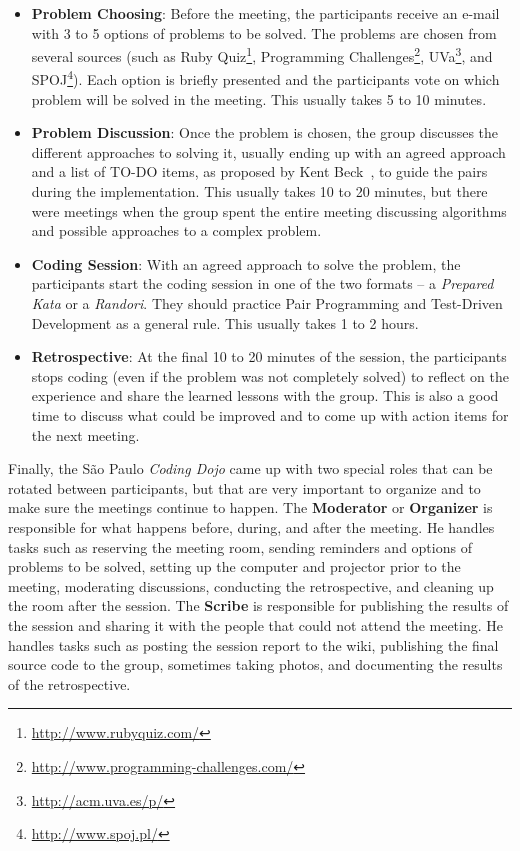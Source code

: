 \begin{itemize}
\item \textbf{Problem Choosing}: Before the meeting, the participants
  receive an e-mail with 3 to 5 options of problems to be solved. The
  problems are chosen from several sources (such as Ruby
  Quiz\footnote{\url{http://www.rubyquiz.com/}}, Programming
  Challenges\footnote{\url{http://www.programming-challenges.com/}},
  UVa\footnote{\url{http://acm.uva.es/p/}}, and
  SPOJ\footnote{\url{http://www.spoj.pl/}}). Each option is briefly
  presented and the participants vote on which problem will be solved
  in the meeting. This usually takes 5 to 10 minutes.
	
\item \textbf{Problem Discussion}: Once the problem is chosen, the
  group discusses the different approaches to solving it, usually
  ending up with an agreed approach and a list of TO-DO items, as
  proposed by Kent Beck~\cite{TDD}, to guide the pairs during the
  implementation. This usually takes 10 to 20 minutes, but there were
  meetings when the group spent the entire meeting discussing
  algorithms and possible approaches to a complex problem.
	
\item \textbf{Coding Session}: With an agreed approach to solve the
  problem, the participants start the coding session in one of the two
  formats -- a \emph{Prepared Kata} or a \emph{Randori}. They should
  practice Pair Programming and Test-Driven Development as a general
  rule. This usually takes 1 to 2 hours.

\item \textbf{Retrospective}: At the final 10 to 20 minutes of the
  session, the participants stops coding (even if the problem was not
  completely solved) to reflect on the experience and share the
  learned lessons with the group. This is also a good time to discuss
  what could be improved and to come up with action items for the next
  meeting.
\end{itemize}

Finally, the São Paulo \emph{Coding Dojo} came up with two special
roles that can be rotated between participants, but that are very
important to organize and to make sure the meetings continue to
happen. The \textbf{Moderator} or \textbf{Organizer} is responsible
for what happens before, during, and after the meeting. He handles
tasks such as reserving the meeting room, sending reminders and
options of problems to be solved, setting up the computer and
projector prior to the meeting, moderating discussions, conducting the
retrospective, and cleaning up the room after the session. The
\textbf{Scribe} is responsible for publishing the results of the
session and sharing it with the people that could not attend the
meeting. He handles tasks such as posting the session report to the
wiki, publishing the final source code to the group, sometimes taking
photos, and documenting the results of the retrospective.
